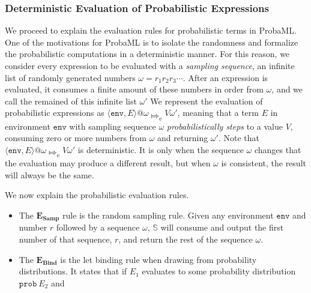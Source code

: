 \documentclass[pageno]{jpaper}
\newcommand{\esteps}{\Mapsto_{\textrm{e}}}
\newcommand{\env}{\mathtt{env}}
\newcommand{\evalenv}[1]{\langle \env, #1 \rangle}
\newcommand{\mt}[1]{\mathtt{#1}}
\newcommand{\rulename}[2]{$\boldsymbol{#1}_{\textbf{#2}}$}
\begin{document}
\subsubsection{Deterministic Evaluation of Probabilistic Expressions}
We proceed to explain the evaluation rules for probabilistic terms in ProbaML. One of the motivations for ProbaML is to isolate the randomness and formalize the probabilistic computations in a deterministic manner. For this reason, we consider every expression to be evaluated with a \emph{sampling sequence}, an infinite list of randomly generated numbers $\omega=r_1 r_2 r_3 \cdots$. After an expression is evaluated, it consumes a finite amount of these numbers in order from $\omega$, and we call the remained of this infinite list $\omega'$
We represent the evaluation of probabilistic expressions as $\evalenv{E} @ \omega \esteps V \omega'$, meaning that a term $E$ in environment $\env$ with sampling sequence $\omega$ \emph{probabilistically steps} to a value $V$, consuming zero or more numbers from $\omega$ and returning $\omega'$. Note that $\evalenv{E} @ \omega \esteps V \omega'$ is deterministic. It is only when the sequence $\omega$ changes that the evaluation may produce a different result, but when $\omega$ is consistent, the result will always be the same.

We now explain the probabilistic evaluation rules.

\begin{itemize}
  \item The \rulename{E}{Samp} rule is the random sampling rule. Given any environment $\env$ and number $r$ followed by a sequence $\omega$, $\mathbb{S}$ will consume and output the first number of that sequence, $r$, and return the rest of the sequence $\omega$.
  \item The \rulename{E}{Bind} is the let binding rule when drawing from probability distributions. It states that if $E_1$ evaluates to some probability distribution $\mt{prob} \ E_2$ and
\end{itemize}
\end{document}
